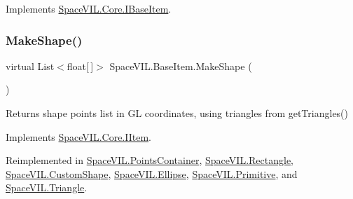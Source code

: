 Implements \mbox{\hyperlink{interface_space_v_i_l_1_1_core_1_1_i_base_item}{Space\+V\+I\+L.\+Core.\+I\+Base\+Item}}.

\mbox{\label{class_space_v_i_l_1_1_base_item_ac111d3d8cef36f406aa11862cefab9e2}} 
\subsubsection{\texorpdfstring{Make\+Shape()}{MakeShape()}}
{\footnotesize\ttfamily virtual List$<$float\mbox{[}$\,$\mbox{]}$>$ Space\+V\+I\+L.\+Base\+Item.\+Make\+Shape (\begin{DoxyParamCaption}{ }\end{DoxyParamCaption})\hspace{0.3cm}{\ttfamily [virtual]}}

\begin{DoxyReturn}{Returns}
shape points list in GL coordinates, using triangles from get\+Triangles()
\end{DoxyReturn}


Implements \mbox{\hyperlink{interface_space_v_i_l_1_1_core_1_1_i_item}{Space\+V\+I\+L.\+Core.\+I\+Item}}.



Reimplemented in \mbox{\hyperlink{class_space_v_i_l_1_1_points_container_a7fd8cf39e463780c871d538b884a3fdb}{Space\+V\+I\+L.\+Points\+Container}}, \mbox{\hyperlink{class_space_v_i_l_1_1_rectangle_acc0a5018e266efaa750459bb875eb805}{Space\+V\+I\+L.\+Rectangle}}, \mbox{\hyperlink{class_space_v_i_l_1_1_custom_shape_aa8a1eb76ab361eea35540787f79fac6f}{Space\+V\+I\+L.\+Custom\+Shape}}, \mbox{\hyperlink{class_space_v_i_l_1_1_ellipse_aa2311fd87e9a988eca0d754ad6e9093d}{Space\+V\+I\+L.\+Ellipse}}, \mbox{\hyperlink{class_space_v_i_l_1_1_primitive_a4e7ed3f8d9e28e0063c36f4f2bf470cd}{Space\+V\+I\+L.\+Primitive}}, and \mbox{\hyperlink{class_space_v_i_l_1_1_triangle_a454090bb2cb1e8635643fce5ecfd7e7c}{Space\+V\+I\+L.\+Triangle}}.

\mbox{\label{class_space_v_i_l_1_1_base_item_a07e16796013b2e7d71b303c006ea2bc7}} 
